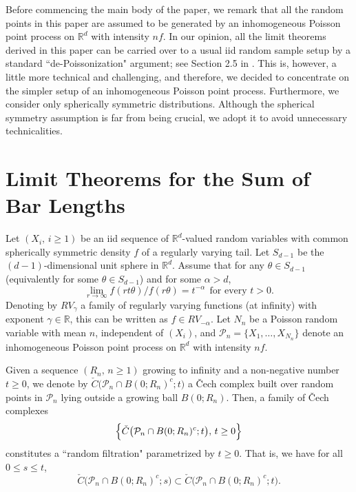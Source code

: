 \documentclass[11pt]{amsart}
\numberwithin{equation}{section}
\theoremstyle{plain}
\theoremstyle{definition}
\begin{document}
Before commencing the main body of the paper, we remark that all the random points in this
paper are assumed to be generated by an inhomogeneous Poisson point process on ${{\mathbb R}}^d$ with intensity
$nf$. In our opinion, all the limit theorems derived in this paper can be carried over to a usual iid random
sample setup by a standard ``de-Poissonization" argument; see Section 2.5 in \cite{penrose:2003}. This is, however, a little more technical and challenging, and therefore, we decided to concentrate on the simpler setup of an inhomogeneous Poisson point process. Furthermore, we consider only spherically symmetric
distributions. Although the spherical symmetry assumption is far from being crucial, we adopt it
to avoid unnecessary technicalities.

\section{Limit Theorems for the Sum of Bar Lengths}

Let $(X_i, \, i \geq 1)$ be an iid sequence of ${{\mathbb R}}^d$-valued random variables with common spherically symmetric density $f$ of a regularly varying tail. Let $S_{d-1}$ be the $(d-1)$-dimensional unit sphere in ${{\mathbb R}}^d$. Assume that for any $\theta \in S_{d-1}$ (equivalently for some $\theta \in S_{d-1}$) and for some $\alpha > d$,
\begin{equation}  \label{e:RV.tail}
\lim_{r\to \infty} f(rt\theta)/f(r\theta) = t^{-\alpha} \ \ \text{for every } t>0.
\end{equation}
Denoting by $RV_{\gamma}$ a family of regularly varying functions (at infinity) with exponent $\gamma \in {{\mathbb R}}$, this can be written as $f \in RV_{-\alpha}$.
Let $N_n$ be a Poisson random variable with mean $n$, independent of $(X_i)$, and ${\mathcal P_n} = \{ X_1,\dots,X_{N_n} \}$ denote an inhomogeneous Poisson point process on ${{\mathbb R}}^d$ with intensity $nf$.

Given a sequence $(R_n, \, n \geq 1)$ growing to infinity and a non-negative number $t \geq 0$, we denote by $\check{C}\bigl( {\mathcal P_n} \cap B(0;R_n)^c; t \bigr)$ a \v{C}ech complex built over random points in ${\mathcal P_n}$ lying outside a growing ball $B(0;R_n)$. Then, a family of \v{C}ech complexes
\begin{equation}  \label{e:filtration.cech}
\Bigl\{  \check{C} \bigl( {\mathcal P_n} \cap B(0; R_n)^c; t \bigr), \, t \geq 0  \Bigr\}
\end{equation}
constitutes a ``random filtration" parametrized by $t\geq 0$. That is, we have for all $0 \leq s \leq t$,
$$
\check{C} \bigl( {\mathcal P_n} \cap B(0; R_n)^c; s \bigr) \subset \check{C} \bigl( {\mathcal P_n} \cap B(0; R_n)^c; t \bigr).
$$
\end{document}
